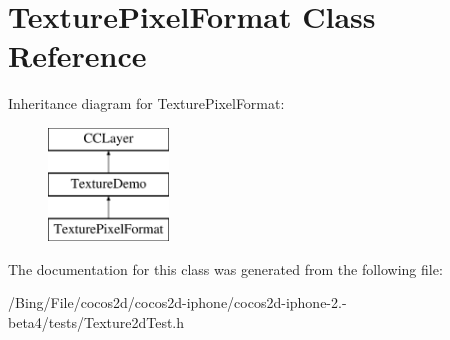 \hypertarget{interface_texture_pixel_format}{\section{Texture\-Pixel\-Format Class Reference}
\label{interface_texture_pixel_format}
}
Inheritance diagram for Texture\-Pixel\-Format\-:\begin{figure}[H]
\begin{center}
\leavevmode
\includegraphics[height=3.000000cm]{interface_texture_pixel_format}
\end{center}
\end{figure}


The documentation for this class was generated from the following file\-:\begin{DoxyCompactItemize}
\item 
/\-Bing/\-File/cocos2d/cocos2d-\/iphone/cocos2d-\/iphone-\/2.-\/beta4/tests/Texture2d\-Test.\-h\end{DoxyCompactItemize}
